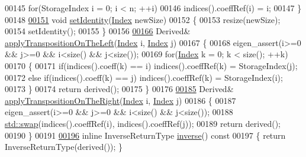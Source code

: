 \begin{DoxyCode}
00145       \textcolor{keywordflow}{for}(StorageIndex i = 0; i < n; ++i)
00146         indices().coeffRef(i) = i;
00147     \}
00148 
\hyperlink{group___core___module_a830a80511a61634ef437795916f7f8da}{00151}     \textcolor{keywordtype}{void} \hyperlink{group___core___module_a830a80511a61634ef437795916f7f8da}{setIdentity}(\hyperlink{group___core___module_a554f30542cc2316add4b1ea0a492ff02}{Index} newSize)
00152     \{
00153       resize(newSize);
00154       setIdentity();
00155     \}
00156 
\hyperlink{group___core___module_a4e3455bf12b56123e38a8220c6b508dc}{00166}     Derived& \hyperlink{group___core___module_a4e3455bf12b56123e38a8220c6b508dc}{applyTranspositionOnTheLeft}(\hyperlink{group___core___module_a554f30542cc2316add4b1ea0a492ff02}{Index} i, 
      \hyperlink{group___core___module_a554f30542cc2316add4b1ea0a492ff02}{Index} j)
00167     \{
00168       eigen\_assert(i>=0 && j>=0 && i<size() && j<size());
00169       \textcolor{keywordflow}{for}(\hyperlink{group___core___module_a554f30542cc2316add4b1ea0a492ff02}{Index} k = 0; k < size(); ++k)
00170       \{
00171         \textcolor{keywordflow}{if}(indices().coeff(k) == i) indices().coeffRef(k) = StorageIndex(j);
00172         \textcolor{keywordflow}{else} \textcolor{keywordflow}{if}(indices().coeff(k) == j) indices().coeffRef(k) = StorageIndex(i);
00173       \}
00174       \textcolor{keywordflow}{return} derived();
00175     \}
00176 
\hyperlink{group___core___module_a5f98da0712570d0c4b12f61839ae4193}{00185}     Derived& \hyperlink{group___core___module_a5f98da0712570d0c4b12f61839ae4193}{applyTranspositionOnTheRight}(\hyperlink{group___core___module_a554f30542cc2316add4b1ea0a492ff02}{Index} i, 
      \hyperlink{group___core___module_a554f30542cc2316add4b1ea0a492ff02}{Index} j)
00186     \{
00187       eigen\_assert(i>=0 && j>=0 && i<size() && j<size());
00188       \hyperlink{endian_8c_a3ca5ecd34b04d6a243c054ac3a57f68d}{std::swap}(indices().coeffRef(i), indices().coeffRef(j));
00189       \textcolor{keywordflow}{return} derived();
00190     \}
00191 
\hyperlink{group___core___module_adb9af427f317202366c2832876064eb3}{00196}     \textcolor{keyword}{inline} InverseReturnType \hyperlink{group___core___module_adb9af427f317202366c2832876064eb3}{inverse}()\textcolor{keyword}{ const}
00197 \textcolor{keyword}{    }\{ \textcolor{keywordflow}{return} InverseReturnType(derived()); \}

\end{DoxyCode}
